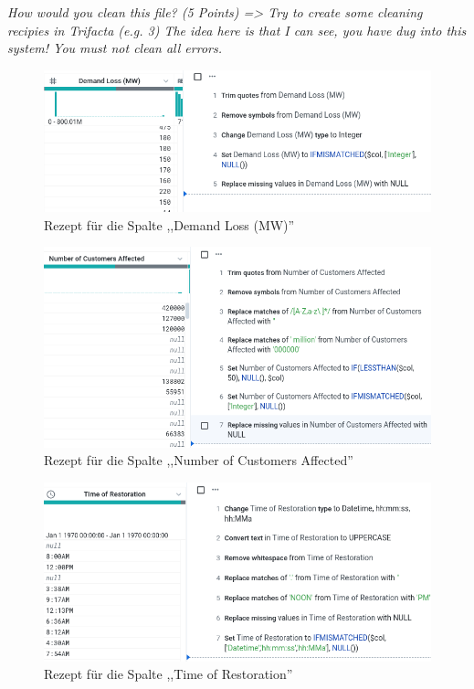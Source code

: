 \documentclass[11pt,a4paper]{article}
\begin{document}
\textit{How would you clean this file? (5 Points) => Try to create some cleaning recipies in Trifacta (e.g. 3) The idea here is that I can see, you have dug into this system! You must not clean all errors.}

\begin{figure}
	\centering
	\includegraphics[width=1\linewidth]{images/recipe_Demand_Loss}
	\caption[Demand Loss]{Rezept für die Spalte ,,Demand Loss (MW)''}
	\label{fig:recipedemandloss}
\end{figure}

\begin{figure}
	\centering
	\includegraphics[width=1\linewidth]{images/Recipe_NumAffectedCustomers}
	\caption[Number of Customers Affected]{Rezept für die Spalte ,,Number of Customers Affected''}
	\label{fig:recipenumaffectedcustomers}
\end{figure}

\begin{figure}
	\centering
	\includegraphics[width=1\linewidth]{images/recipe_TimeRestoration}
	\caption[Time of Restoration]{Rezept für die Spalte ,,Time of Restoration''}
	\label{fig:recipetimerestoration}
\end{figure}
\end{document}
